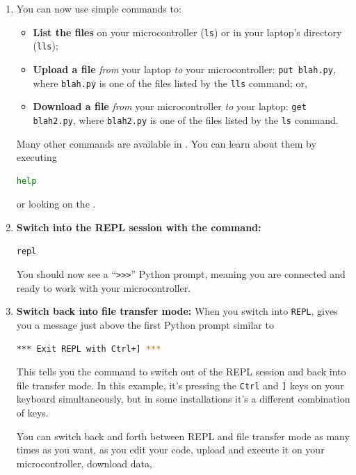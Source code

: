 \begin{enumerate}
\item You can now use simple commands to: \begin{itemize}
	\item \textbf{List the files} on your microcontroller (\texttt{ls}) or in your laptop's directory (\texttt{lls});
	\item \textbf{Upload a file} \textit{from} your laptop \textit{to} your microcontroller: \texttt{put blah.py}, where \texttt{blah.py} is one of the files listed by the \texttt{lls} command; or,
	\item \textbf{Download a file} \textit{from} your microcontroller \textit{to} your laptop: \texttt{get blah2.py}, where \texttt{blah2.py} is one of the files listed by the \texttt{ls} command.
\end{itemize}
Many other commands are available in \mpfshell.
You can learn about them by executing
\begin{lstlisting}[language=bash]
help
\end{lstlisting}
 or looking on the .
\item \textbf{Switch into the REPL session with the command:}
\begin{lstlisting}[language=bash]
repl
\end{lstlisting}
You should now see a ``\verb|>>>|'' Python prompt, meaning you are connected and ready to work with your microcontroller.

\item \textbf{Switch back into file transfer mode:}
When you switch into \texttt{REPL}, \mpfshell gives you a message just above the first Python prompt similar to
\begin{lstlisting}[language=bash]
*** Exit REPL with Ctrl+] ***
\end{lstlisting}
This tells you the command to switch out of the REPL session and back into file transfer mode. In this example, it's pressing the \verb|Ctrl| and \verb|]| keys on your keyboard simultaneously, but in some installations it's a different combination of keys.

\smallskip
You can switch back and forth between REPL and file transfer mode as many times as you want, as you edit your code, upload and execute it on your microcontroller, download data, \etc

\end{enumerate}




